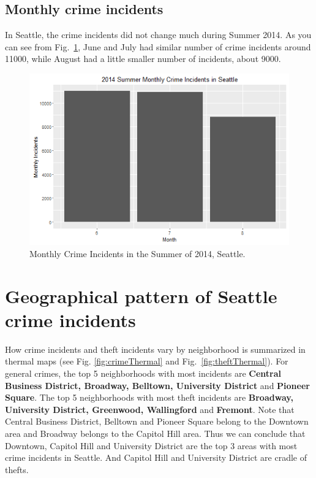 \documentclass[a4paper]{article}
\begin{document}
	\subsection{Monthly crime incidents}
    In Seattle, the crime incidents did not change much during Summer 2014. As you can see from Fig.~\ref{fig:monthlycrime}, June and July had similar number of crime incidents around 11000, while August had a little smaller number of incidents, about 9000.
 \begin{figure}
\centering
\includegraphics[width=1\textwidth]{MonthlyCrime.png}
\caption{\label{fig:monthlycrime}Monthly Crime Incidents in the Summer of 2014, Seattle.}
\end{figure} 	

\section{Geographical pattern of Seattle crime incidents}
How crime incidents and theft incidents vary by neighborhood is summarized in thermal maps (see Fig. \ref{fig:crimeThermal} and Fig.~\ref{fig:theftThermal}). For general crimes, the top 5 neighborhoods with most incidents are \textbf{Central Business District, Broadway, Belltown, University District} and \textbf{Pioneer Square}. The top 5 neighborhoods with most theft incidents are \textbf{Broadway, University District, Greenwood, Wallingford} and \textbf{Fremont}. Note that Central Business District, Belltown and Pioneer Square belong to the Downtown area and Broadway belongs to the Capitol Hill area. Thus we can conclude that Downtown, Capitol Hill and University District are the top 3 areas with most crime incidents in Seattle. And Capitol Hill and University District are cradle of thefts. 
\end{document}
